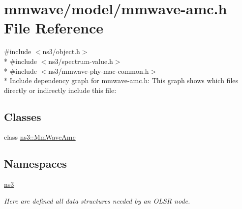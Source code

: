 \hypertarget{mmwave-amc_8h}{}\section{mmwave/model/mmwave-\/amc.h File Reference}
\label{mmwave-amc_8h}
{\ttfamily \#include $<$ns3/object.\+h$>$}\\*
{\ttfamily \#include $<$ns3/spectrum-\/value.\+h$>$}\\*
{\ttfamily \#include $<$ns3/mmwave-\/phy-\/mac-\/common.\+h$>$}\\*
Include dependency graph for mmwave-\/amc.h\+:
This graph shows which files directly or indirectly include this file\+:
\subsection*{Classes}
\begin{DoxyCompactItemize}
\item 
class \hyperlink{classns3_1_1MmWaveAmc}{ns3\+::\+Mm\+Wave\+Amc}
\end{DoxyCompactItemize}
\subsection*{Namespaces}
\begin{DoxyCompactItemize}
\item 
 \hyperlink{namespacens3}{ns3}
\begin{DoxyCompactList}\small\item\em Here are defined all data structures needed by an O\+L\+SR node. \end{DoxyCompactList}\end{DoxyCompactItemize}
